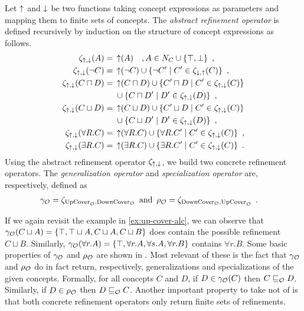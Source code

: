 \begin{definition}
  Let $\operatorname{\uparrow}$ and $\operatorname{\downarrow}$ be two functions taking concept expressions as parameters and mapping them to finite sets of concepts.
  The \emph{abstract refinement operator} is defined recursively by induction on the structure of concept expressions as follows.
  \begin{align*}
    \zeta_{\operatorname{\uparrow},\operatorname{\downarrow}}(A) ={} & \operatorname{\uparrow}(A) \quad, A \in N_C \cup \{\top, \bot\} \enspace, \\
    \zeta_{\operatorname{\uparrow},\operatorname{\downarrow}}(\lnot C) ={} & \operatorname{\uparrow}(\lnot C) \cup \{ \lnot C' \mid C' \in \zeta_{\operatorname{\downarrow},\operatorname{\uparrow}}(C) \} \enspace, \\
    \zeta_{\operatorname{\uparrow},\operatorname{\downarrow}}(C \sqcap D) ={} & \operatorname{\uparrow}(C \sqcap D) \cup \{ C' \sqcap D \mid C' \in \zeta_{\operatorname{\uparrow},\operatorname{\downarrow}}(C) \} \\
    & \cup \{ C \sqcap D' \mid D' \in \zeta_{\operatorname{\uparrow},\operatorname{\downarrow}}(D) \} \enspace, \\
    \zeta_{\operatorname{\uparrow},\operatorname{\downarrow}}(C \sqcup D) ={} & \operatorname{\uparrow}(C \sqcup D) \cup \{ C' \sqcup D \mid C' \in \zeta_{\operatorname{\uparrow},\operatorname{\downarrow}}(C) \} \\
    & \cup \{ C \sqcup D' \mid D' \in \zeta_{\operatorname{\uparrow},\operatorname{\downarrow}}(D) \} \enspace, \\
    \zeta_{\operatorname{\uparrow},\operatorname{\downarrow}}(\forall R.C) ={} & \operatorname{\uparrow}(\forall R.C)
    \cup \{ \forall R.C' \mid C' \in \zeta_{\operatorname{\uparrow},\operatorname{\downarrow}}(C) \} \enspace, \\
    \zeta_{\operatorname{\uparrow},\operatorname{\downarrow}}(\exists R.C) ={} & \operatorname{\uparrow}(\exists R.C)
    \cup \{ \exists R.C' \mid C' \in \zeta_{\operatorname{\uparrow},\operatorname{\downarrow}}(C) \} \enspace.
  \end{align*}
  Using the abstract refinement operator $\zeta_{\operatorname{\uparrow},\operatorname{\downarrow}}$, we build two concrete refinement operators. The \emph{generalization operator} and \emph{specialization operator} are, respectively, defined as
  \begin{align*}
    \gamma_\mathcal{O} &= \zeta_{{\operatorname{UpCover}}_\mathcal{O},{\operatorname{DownCover}}_\mathcal{O}} \enspace \text{and} \enspace
    \rho_\mathcal{O} = \zeta_{{\operatorname{DownCover}}_\mathcal{O},{\operatorname{UpCover}}_\mathcal{O}} \enspace.
  \end{align*}
\end{definition}

If we again revisit the example in \cref{ex:up-cover-alc}, we can observe that $\gamma_\mathcal{O}(C \sqcup A) = \{ \top, \top \sqcup A, C \sqcup A, C \sqcup B \}$ does contain the possible refinement $C \sqcup B$. Similarly, $\gamma_\mathcal{O}(\forall r.A) = \{ \top, \forall r.A, \forall s.A, \forall r.B \}$ contains $\forall r.B$. Some basic properties of $\gamma_\mathcal{O}$ and $\rho_\mathcal{O}$ are shown in \cite{troquard2018repairing}. Most relevant of these is the fact that $\gamma_\mathcal{O}$ and $\rho_\mathcal{O}$ do in fact return, respectively, generalizations and specializations of the given concepts. Formally, for all concepts $C$ and $D$, if $D \in \gamma_\mathcal{O}(C)$ then $C \sqsubseteq_\mathcal{O} D$. Similarly, if $D \in \rho_\mathcal{O}$ then $D \sqsubseteq_\mathcal{O} C$. Another important property to take not of is that both concrete refinement operators only return finite sets of refinements.

